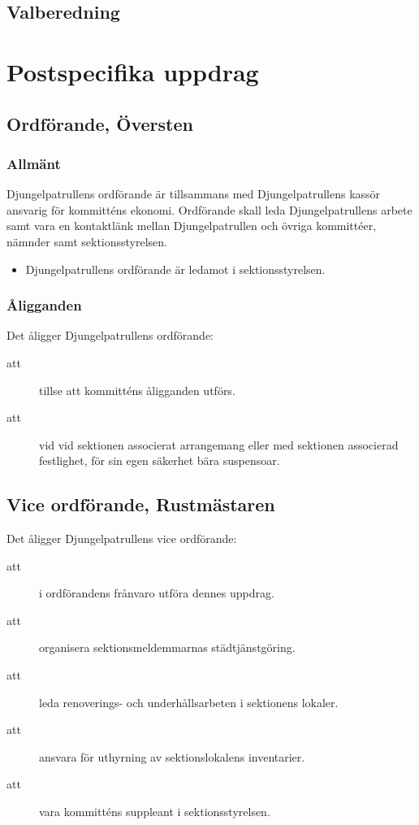 \documentclass[a4paper]{article}
\begin{document}
\begin{foreningenv}{\forening{}}
    \subsection{Valberedning}
    \aliggvalber{}
    
    \section{Postspecifika uppdrag}
    \subsection{Ordförande, Översten}
    \subsubsection{Allmänt}
    Djungelpatrullens ordförande är tillsammans med Djungelpatrullens kassör ansvarig för kommitténs ekonomi. Ordförande skall leda Djungelpatrullens arbete samt vara en kontaktlänk mellan Djungelpatrullen och övriga kommittéer, nämnder samt sektionsstyrelsen.
    \begin{itemize}
        \item Djungelpatrullens ordförande är ledamot i sektionsstyrelsen.
    \end{itemize}
    
    \subsubsection{Åligganden}
    Det åligger Djungelpatrullens ordförande:
    \begin{description}
        \item[att] tillse att kommitténs åligganden utförs.
        \item[att] vid vid sektionen associerat arrangemang eller med sektionen associerad festlighet, för sin egen säkerhet bära suspensoar.
    \end{description}
    
    \subsection{Vice ordförande, Rustmästaren}
    Det åligger Djungelpatrullens vice ordförande:
    \begin{description}
        \item[att] i ordförandens frånvaro utföra dennes uppdrag.
        \item[att] organisera sektionsmeldemmarnas städtjänstgöring.
        \item[att] leda renoverings- och underhållsarbeten i sektionens lokaler.
        \item[att] ansvara för uthyrning av sektionslokalens inventarier.
        \item[att] vara kommitténs suppleant i sektionsstyrelsen.
    \end{description}
    

\end{foreningenv}
\end{document}
